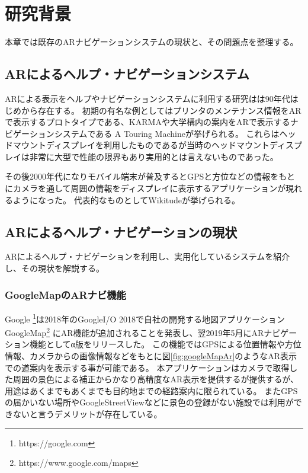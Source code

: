 \chapter{研究背景}
\label{chap:background}

本章では既存のARナビゲーションシステムの現状と、その問題点を整理する。

\newpage


\section{ARによるヘルプ・ナビゲーションシステム}
ARによる表示をヘルプやナビゲーションシステムに利用する研究はは90年代はじめから存在する。
初期の有名な例としてはプリンタのメンテナンス情報をARで表示するプロトタイプである、KARMA\cite{10.1145/159544.159587}や大学構内の案内をARで表示するナビゲーションシステムである A Touring Machine\cite{629922}が挙げられる。
これらはヘッドマウントディスプレイを利用したものであるが当時のヘッドマウントディスプレイは非常に大型で性能の限界もあり実用的とは言えないものであった。

その後2000年代になりモバイル端末が普及するとGPSと方位などの情報をもとにカメラを通して周囲の情報をディスプレイに表示するアプリケーションが現れるようになった。
代表的なものとしてWikitude\cite{wikitube}が挙げられる。


\section{ARによるヘルプ・ナビゲーションの現状}
\label{current}
ARによるヘルプ・ナビゲーションを利用し、実用化しているシステムを紹介し、その現状を解説する。

\subsection{GoogleMapのARナビ機能}
Google \footnote{\textsf{https://google.com}}は2018年のGoogleI/O 2018で自社の開発する地図アプリケーションGoogleMap\footnote{https://www.google.com/maps} にAR機能が追加されることを発表し、翌2019年5月にARナビゲーション機能としてα版をリリースした。
この機能ではGPSによる位置情報や方位情報、カメラからの画像情報などをもとに図\ref{fig:googleMapAr}のようなAR表示での道案内を表示する事が可能である。
本アプリケーションはカメラで取得した周囲の景色による補正からかなり高精度なAR表示を提供するが提供するが、用途はあくまでもあくまでも目的地までの経路案内に限られている。
またGPSの届かいない場所やGoogleStreetViewなどに景色の登録がない施設では利用ができないと言うデメリットが存在している。

